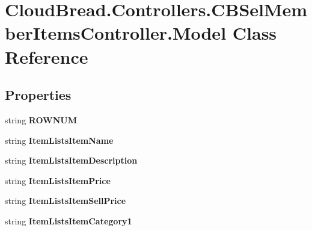 \hypertarget{a00163}{}\section{Cloud\+Bread.\+Controllers.\+C\+B\+Sel\+Member\+Items\+Controller.\+Model Class Reference}
\label{a00163}
\subsection*{Properties}
\begin{DoxyCompactItemize}
\item 
string {\bfseries R\+O\+W\+N\+UM}\hypertarget{a00163_a01971bab9e92a07d9a7fd2af003a482a}{}\label{a00163_a01971bab9e92a07d9a7fd2af003a482a}

\item 
string {\bfseries Item\+Lists\+Item\+Name}\hypertarget{a00163_abb12a70b3f724006adffd3708483435f}{}\label{a00163_abb12a70b3f724006adffd3708483435f}

\item 
string {\bfseries Item\+Lists\+Item\+Description}\hypertarget{a00163_a2913b144d9f9f82ff1536460001009df}{}\label{a00163_a2913b144d9f9f82ff1536460001009df}

\item 
string {\bfseries Item\+Lists\+Item\+Price}\hypertarget{a00163_a14b04d6b2693b55cfa94cfd8757fbaf4}{}\label{a00163_a14b04d6b2693b55cfa94cfd8757fbaf4}

\item 
string {\bfseries Item\+Lists\+Item\+Sell\+Price}\hypertarget{a00163_a5679c48231d503879d1c502ba6f8f07f}{}\label{a00163_a5679c48231d503879d1c502ba6f8f07f}

\item 
string {\bfseries Item\+Lists\+Item\+Category1}\hypertarget{a00163_adef8c2fae9946d3f30354b1f5665cb01}{}\label{a00163_adef8c2fae9946d3f30354b1f5665cb01}


\end{DoxyCompactItemize}
